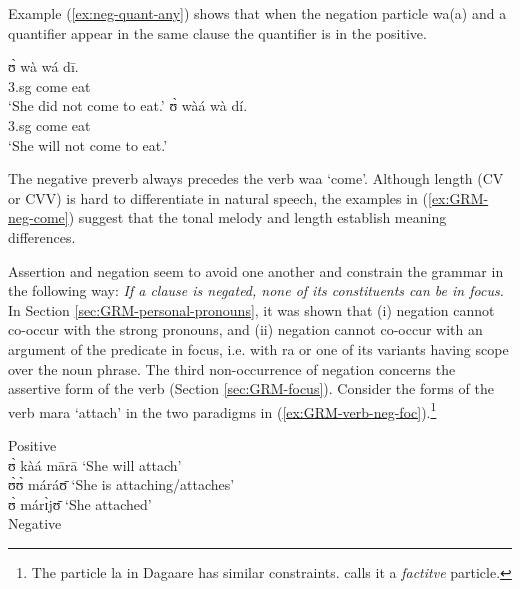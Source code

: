 \begin{exe}
\begin{exe}
\begin{exe}
{\begin{exe}
\begin{exe}
\begin{exe}
\begin{exe}
\begin{exe}
\begin{exe}
\begin{exe}
\begin{exe}
\begin{exe}
\begin{exe}
\begin{exe}
\begin{exe}
\begin{exe}
\begin{exe}
\begin{exe}
\begin{exe}
\begin{exe}
\begin{exe}
\begin{exe}
\begin{exe}
 Example (\ref{ex:neg-quant-any}) shows that when the negation particle {\sls 
wa(a)} and a quantifier appear in the same clause the quantifier is  in the 
positive. 




\ea\label{ex:GRM-neg-come}
 
  
\ea\label{}
\gll ʊ̀ wà wá dī.\\
{\sc 3.sg} {\neg} come eat\\
\glt `She did not come to eat.'
\ex\label{}
\gll ʊ̀ wàá wà dí.\\
{\sc 3.sg} {\neg} come eat\\
\glt `She will not come to eat.'

\z 
 \z
 
 The negative preverb  always precedes the verb {\sls waa} `come'. Although 
length (CV or CVV) is  hard to differentiate in natural speech, the examples in 
(\ref{ex:GRM-neg-come}) suggest that the tonal melody and length  establish 
meaning differences.

Assertion and negation seem to avoid one another and constrain the grammar  in
the following way:  {\it If a clause is negated,  none of its constituents can
be in focus.} In Section \ref{sec:GRM-personal-pronouns},  it was shown that (i)
negation cannot co-occur with the strong pronouns, and (ii) negation cannot
co-occur with an argument of the predicate in focus, i.e. with {\sls ra} or one 
of
its variants having scope over the noun phrase. The third non-occurrence of
negation concerns  the assertive form of the verb (Section
\ref{sec:GRM-focus}).  Consider the forms of the verb {\sls mara} `attach' in 
the
two paradigms in (\ref{ex:GRM-verb-neg-foc}).\footnote{The particle {\sls la} in
Dagaare has similar constraints. \citet[94]{Bodo97} calls it a {\it factitve}
particle.}





   \ea\label{ex:GRM-verb-neg-foc}

   \ea\label{ex:GRM-verb-neg-foc-pos}{\rm Positive}\\

 ʊ̀ kàá mārā   {\rm  `She will attach'}\\
   ʊ̀ʊ̀ máráʊ̄  {\rm  `She  is attaching/attaches'}\\
  ʊ̀ márɪ̀jʊ̄ {\rm `She   attached'}\\

  \ex\label{ex:GRM-verb-neg-foc-neg}{\rm Negative}\\


\end{exe}
\end{exe}
\end{exe}
\end{exe}
\end{exe}
\end{exe}
\end{exe}
\end{exe}
\end{exe}
\end{exe}
\end{exe}
\end{exe}
\end{exe}
\end{exe}
\end{exe}
\end{exe}
\end{exe}
\end{exe}
\end{exe}
\end{exe}}
\end{exe}
\end{exe}
\end{exe}
